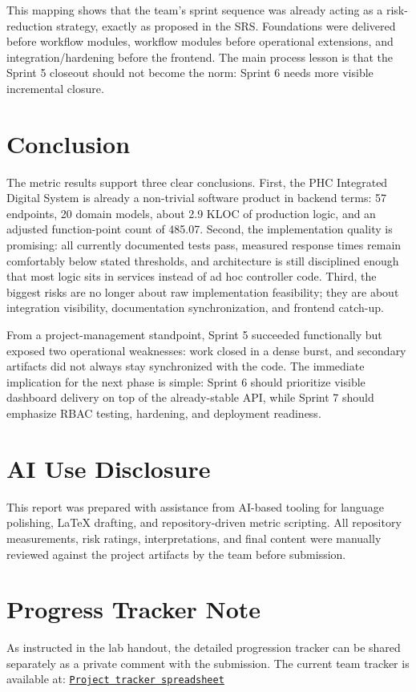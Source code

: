 \documentclass[conference]{IEEEtran}
\begin{document}
This mapping shows that the team's sprint sequence was already acting as a risk-reduction strategy, exactly as proposed in the SRS. Foundations were delivered before workflow modules, workflow modules before operational extensions, and integration/hardening before the frontend. The main process lesson is that the Sprint 5 closeout should not become the norm: Sprint 6 needs more visible incremental closure.

\section{Conclusion}
The metric results support three clear conclusions. First, the PHC Integrated Digital System is already a non-trivial software product in backend terms: 57 endpoints, 20 domain models, about 2.9 KLOC of production logic, and an adjusted function-point count of 485.07. Second, the implementation quality is promising: all currently documented tests pass, measured response times remain comfortably below stated thresholds, and architecture is still disciplined enough that most logic sits in services instead of ad hoc controller code. Third, the biggest risks are no longer about raw implementation feasibility; they are about integration visibility, documentation synchronization, and frontend catch-up.

From a project-management standpoint, Sprint 5 succeeded functionally but exposed two operational weaknesses: work closed in a dense burst, and secondary artifacts did not always stay synchronized with the code. The immediate implication for the next phase is simple: Sprint 6 should prioritize visible dashboard delivery on top of the already-stable API, while Sprint 7 should emphasize RBAC testing, hardening, and deployment readiness.

\section*{AI Use Disclosure}
This report was prepared with assistance from AI-based tooling for language polishing, LaTeX drafting, and repository-driven metric scripting. All repository measurements, risk ratings, interpretations, and final content were manually reviewed against the project artifacts by the team before submission.

\section*{Progress Tracker Note}
As instructed in the lab handout, the detailed progression tracker can be shared separately as a private comment with the submission. The current team tracker is available at:
\newline
\href{https://docs.google.com/spreadsheets/d/1xLa2L8eWv8gfrIwPXrnImF8uManlRlRwRp3ksSOVI9E/edit?usp=sharing}{\texttt{Project tracker spreadsheet}}
\end{document}

